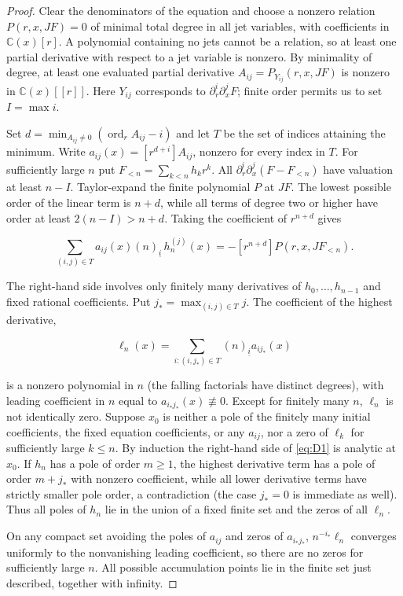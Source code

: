 \documentclass[11pt,a4paper]{article}
\numberwithin{equation}{section}
\theoremstyle{plain}
\theoremstyle{definition}
\begin{document}
\begin{proof}

Clear the denominators of the equation and choose a nonzero relation \(P(r,x,J F)=0\) of minimal total degree in all jet variables, with coefficients in \(\mathbb C(x)[r]\). A polynomial containing no jets cannot be a relation, so at least one partial derivative with respect to a jet variable is nonzero. By minimality of degree, at least one evaluated partial derivative \(A_{ij}=P_{Y_{ij}}(r,x,J F)\) is nonzero in \(\mathbb C(x)[[r]]\). Here \(Y_{ij}\) corresponds to \(\partial_r^i\partial_x^j F\); finite order permits us to set \(I=\max i\).

Set \(d=\min_{A_{ij}\ne0}(\operatorname{ord}_r A_{ij}-i)\) and let \(T\) be the set of indices attaining the minimum. Write \(a_{ij}(x)=[r^{d+i}]A_{ij}\), nonzero for every index in \(T\). For sufficiently large \(n\) put \(F_{<n}=\sum_{k<n}h_k r^k\). All \(\partial_r^i\partial_x^j(F-F_{<n})\) have valuation at least \(n-I\). Taylor-expand the finite polynomial \(P\) at \(JF\). The lowest possible order of the linear term is \(n+d\), while all terms of degree two or higher have order at least \(2(n-I)>n+d\). Taking the coefficient of \(r^{n+d}\) gives

\begin{equation}
\sum_{(i,j)\in T} a_{ij}(x)(n)_{\underline i}\, h_n^{(j)}(x)=-[r^{n+d}]P(r,x,J F_{<n}).
\label{eq:D1}
\end{equation}

The right-hand side involves only finitely many derivatives of \(h_0,\ldots,h_{n-1}\) and fixed rational coefficients. Put \(j_*=\max_{(i,j)\in T}j\). The coefficient of the highest derivative,

\begin{equation}
\ell_n(x)=\sum_{i:(i,j_*)\in T}(n)_{\underline i} a_{ij_*}(x)
\label{eq:D2}
\end{equation}

is a nonzero polynomial in \(n\) (the falling factorials have distinct degrees), with leading coefficient in \(n\) equal to \(a_{i_*j_*}(x)\not\equiv0\). Except for finitely many \(n\), \(\ell_n\) is not identically zero. Suppose \(x_0\) is neither a pole of the finitely many initial coefficients, the fixed equation coefficients, or any \(a_{ij}\), nor a zero of \(\ell_k\) for sufficiently large \(k\le n\). By induction the right-hand side of \eqref{eq:D1} is analytic at \(x_0\). If \(h_n\) has a pole of order \(m\ge1\), the highest derivative term has a pole of order \(m+j_*\) with nonzero coefficient, while all lower derivative terms have strictly smaller pole order, a contradiction (the case \(j_*=0\) is immediate as well). Thus all poles of \(h_n\) lie in the union of a fixed finite set and the zeros of all \(\ell_n\).

On any compact set avoiding the poles of \(a_{ij}\) and zeros of \(a_{i_*j_*}\), \(n^{-i_*}\ell_n\) converges uniformly to the nonvanishing leading coefficient, so there are no zeros for sufficiently large \(n\). All possible accumulation points lie in the finite set just described, together with infinity.

\end{proof}
\end{document}
